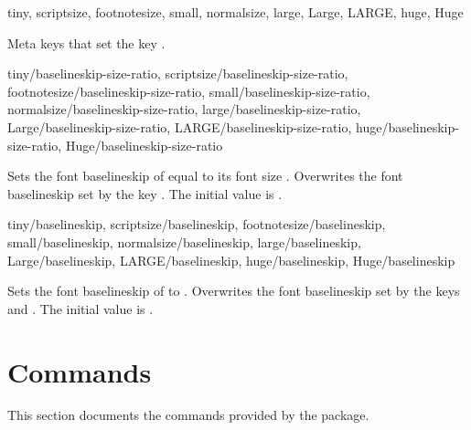 \documentclass{beerydoc}
\begin{document}
\begin{codedoc}
  {
    tiny, scriptsize, footnotesize, small, normalsize,
    large, Large, LARGE, huge, Huge
  }
  \begin{syntax}
  \end{syntax}
  Meta keys that set the key .
\end{codedoc}

\begin{codedoc}
  {
    tiny/baselineskip-size-ratio,
    scriptsize/baselineskip-size-ratio,
    footnotesize/baselineskip-size-ratio,
    small/baselineskip-size-ratio,
    normalsize/baselineskip-size-ratio,
    large/baselineskip-size-ratio,
    Large/baselineskip-size-ratio,
    LARGE/baselineskip-size-ratio,
    huge/baselineskip-size-ratio,
    Huge/baselineskip-size-ratio
  }
  \begin{syntax}
  \end{syntax}
  Sets the font baselineskip of  equal to its font
  size \texttimes{} .
  Overwrites the font baselineskip set by the key
  .
  The initial value is .
\end{codedoc}

\begin{codedoc}
  {
    tiny/baselineskip,
    scriptsize/baselineskip,
    footnotesize/baselineskip,
    small/baselineskip,
    normalsize/baselineskip,
    large/baselineskip,
    Large/baselineskip,
    LARGE/baselineskip,
    huge/baselineskip,
    Huge/baselineskip
  }
  \begin{syntax}
  \end{syntax}
  Sets the font baselineskip of  to .
  Overwrites the font baselineskip set by the keys
   and
  .
  The initial value is .
\end{codedoc}


\section{Commands}
\label{sec:cmds}

This section documents the commands provided by the  package.
\end{document}
